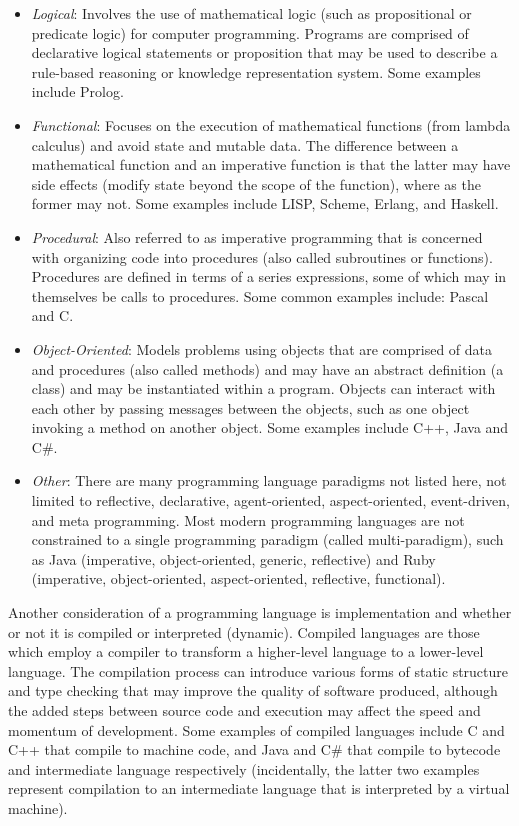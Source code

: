 \documentclass[a4paper, 11pt]{article}
\begin{document}
\begin{itemize}
	\item \emph{Logical}: Involves the use of mathematical logic (such as propositional or predicate logic) for computer programming. Programs are comprised of declarative logical statements or proposition that may be used to describe a rule-based reasoning or knowledge representation system. Some examples include Prolog. 
	\item \emph{Functional}: Focuses on the execution of mathematical functions (from lambda calculus) and avoid state and mutable data. The difference between a mathematical function and an imperative function is that the latter may have side effects (modify state beyond the scope of the function), where as the former may not. Some examples include LISP, Scheme, Erlang, and Haskell.	
	\item \emph{Procedural}: Also referred to as imperative programming that is concerned with organizing code into procedures (also called subroutines or functions). Procedures are defined in terms of a series expressions, some of which may in themselves be calls to procedures. Some common examples include: Pascal and C.
	\item \emph{Object-Oriented}: Models problems using objects that are comprised of data and procedures (also called methods) and may have an abstract definition (a class) and may be instantiated within a program. Objects can interact with each other by passing messages between the objects, such as one object invoking a method on another object. Some examples include C++, Java and C\#.
	\item \emph{Other}: There are many programming language paradigms not listed here, not limited to reflective, declarative, agent-oriented, aspect-oriented, event-driven, and meta programming. Most modern programming languages are not constrained to a single programming paradigm (called multi-paradigm), such as Java (imperative, object-oriented, generic, reflective) and Ruby (imperative, object-oriented, aspect-oriented, reflective, functional).
\end{itemize}

Another consideration of a programming language is implementation and whether or not it is compiled or interpreted (dynamic). 
Compiled languages are those which employ a compiler to transform a higher-level language to a lower-level language. The compilation process can introduce various forms of static structure and type checking that may improve the quality of software produced, although the added steps between source code and execution may affect the speed and momentum of development. Some examples of compiled languages include C and C++ that compile to machine code, and Java and C\# that compile to bytecode and intermediate language respectively (incidentally, the latter two examples represent compilation to an intermediate language that is interpreted by a virtual machine).
\end{document}
